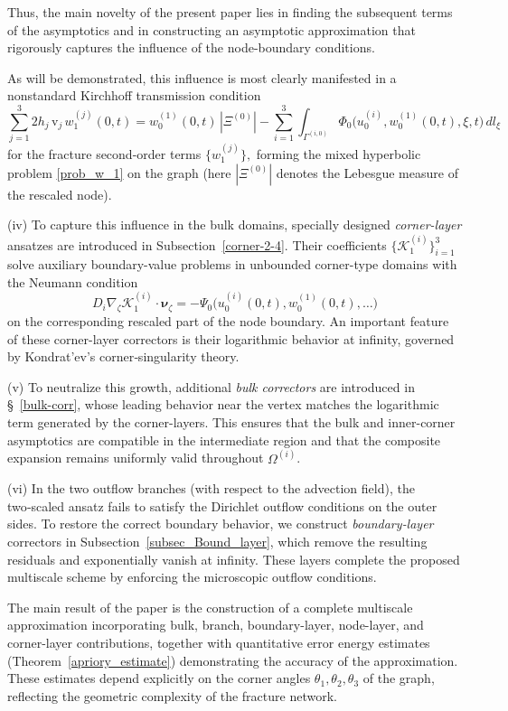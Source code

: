 \documentclass[reqno]{amsart}            %
\numberwithin{equation}{section}
\begin{document}
	Thus, the main novelty of the present paper lies in finding the subsequent terms of the asymptotics and in constructing  an asymptotic approximation that rigorously captures the influence of the node-boundary conditions.
	
	As will be demonstrated, this influence is most clearly manifested in a nonstandard Kirchhoff transmission condition
		\begin{equation}\label{Kirch-2}
			\sum_{j=1}^{3} 2 h_j\,\mathrm{v}_j\, w_1^{(j)}(0,t)
			= w^{(1)}_0(0,t)\, |\Xi^{(0)}|
			- \sum_{i=1}^{3}\int_{\Gamma^{(i,0)}}\Phi_0\big(u^{(i)}_0, w^{(1)}_0(0,t), \xi,t\big)\, dl_\xi
		\end{equation}
		for the fracture second-order terms $\{w_1^{(j)}\},$  forming the mixed hyperbolic problem \eqref{prob_w_1} on the graph (here $|\Xi^{(0)}|$ denotes the Lebesgue measure of the rescaled node).
		
	(iv) To capture this influence in the bulk domains, specially designed  \textit{corner-layer} ansatzes are introduced in 
	Subsection~\ref{corner-2-4}. Their coefficients $\{\mathcal{K}^{(i)}_1\}_{i=1}^3$  solve auxiliary
	boundary-value problems in unbounded  corner-type domains with the Neumann condition
	\[
	D_i \nabla_\zeta \mathcal{K}^{(i)}_1 \cdot \boldsymbol{\nu}_\zeta
	= - \Psi_0\big(u_0^{(i)}(0,t), w_0^{(1)}(0,t),\ldots\big)
	\]
	on the corresponding rescaled part of the node boundary. An important feature of these corner-layer correctors is their 
	logarithmic behavior at infinity, governed by Kondrat’ev’s corner‑singularity theory.  
	
	(v) To neutralize this growth, additional \emph{bulk correctors} are introduced in \S~\ref{bulk-corr}, whose leading behavior near the
	vertex matches the logarithmic term generated by the corner-layers. This ensures that the bulk and inner-corner asymptotics are compatible in the intermediate region and that the composite expansion remains uniformly valid
	throughout $\Omega^{(i)}$.
	
	(vi) In the two outflow branches (with respect to the advection field), the two‑scaled ansatz fails to satisfy the Dirichlet outflow conditions on the outer sides. To restore the correct boundary behavior, we construct \textit{boundary‑layer} correctors in Subsection~\ref{subsec_Bound_layer}, which remove the resulting residuals and exponentially vanish at infinity. These layers complete the proposed multiscale scheme by enforcing the microscopic outflow conditions.
	
	The main result of the paper is the construction of a complete multiscale approximation incorporating bulk, branch, boundary-layer, node-layer, and corner-layer contributions, together with quantitative error energy estimates (Theorem~\ref{apriory_estimate}) demonstrating the accuracy of the approximation. These estimates depend explicitly on the corner angles
	$\theta_1,\theta_2,\theta_3$ of the graph, reflecting the geometric complexity
	of the fracture network.
	
\end{document}
